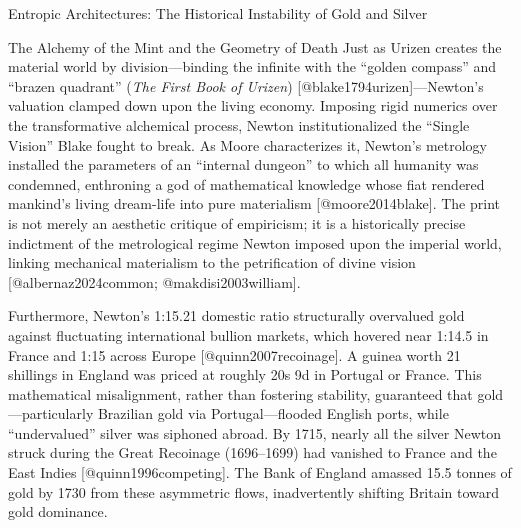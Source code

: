 \documentclass[
  ignorenonframetext,
]{beamer}
\begin{document}
\begin{frame}{Entropic Architectures: The Historical Instability of Gold
and Silver}
\begin{block}{The Alchemy of the Mint and the Geometry of Death}
Just as Urizen creates the material world by division---binding the
infinite with the ``golden compass'' and ``brazen quadrant'' (\emph{The
First Book of Urizen}) {[}@blake1794urizen{]}---Newton's valuation
clamped down upon the living economy. Imposing rigid numerics over the
transformative alchemical process, Newton institutionalized the ``Single
Vision'' Blake fought to break. As Moore characterizes it, Newton's
metrology installed the parameters of an ``internal dungeon'' to which
all humanity was condemned, enthroning a god of mathematical knowledge
whose fiat rendered mankind's living dream-life into pure materialism
{[}@moore2014blake{]}. The print is not merely an aesthetic critique of
empiricism; it is a historically precise indictment of the metrological
regime Newton imposed upon the imperial world, linking mechanical
materialism to the petrification of divine vision
{[}@albernaz2024common; @makdisi2003william{]}.

Furthermore, Newton's 1:15.21 domestic ratio structurally overvalued
gold against fluctuating international bullion markets, which hovered
near 1:14.5 in France and 1:15 across Europe {[}@quinn2007recoinage{]}.
A guinea worth 21 shillings in England was priced at roughly 20s 9d in
Portugal or France. This mathematical misalignment, rather than
fostering stability, guaranteed that gold---particularly Brazilian gold
via Portugal---flooded English ports, while ``undervalued'' silver was
siphoned abroad. By 1715, nearly all the silver Newton struck during the
Great Recoinage (1696--1699) had vanished to France and the East Indies
{[}@quinn1996competing{]}. The Bank of England amassed 15.5 tonnes of
gold by 1730 from these asymmetric flows, inadvertently shifting Britain
toward gold dominance.


\end{block}
\end{frame}
\end{document}
